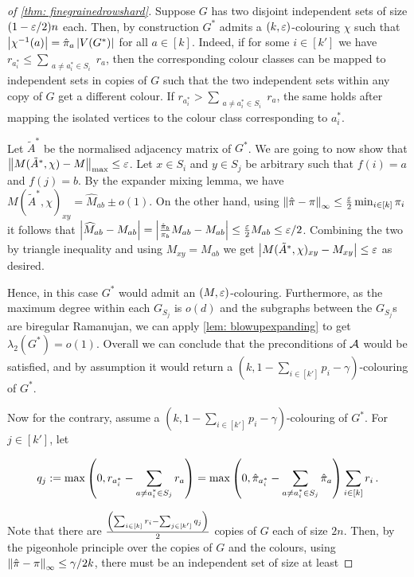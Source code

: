 \begin{proof}[of \cref{thm: finegrainedrowshard}]
    Suppose $G$ has two disjoint independent sets of size $(1-\varepsilon/2)n$ each. Then, by construction $G^*$ admits a $(k, \varepsilon)$-colouring $\chi$ such that $\left\lvert\chi^{-1}(a)\right\rvert=\hat{\pi}_a \left\lvert V(G^*)\right\rvert$ for all $a\in[k]$. Indeed, if for some $i\in[k']$ we have $r_{a_i^*} \leq \sum_{\substack{a \neq a_i^{*} \in S_i}} r_a$, then the corresponding colour classes can be mapped to independent sets in copies of $G$ such that the two independent sets within any copy of $G$ get a different colour. If $r_{a_i^*} > \sum_{\substack{a \neq a_i^{*} \in S_i}} r_a$, the same holds after mapping the isolated vertices to the colour class corresponding to $a_i^*$.
    
    Let $\tilde{A}^*$ be the normalised adjacency matrix of $G^*$. We are going to now show that $\left\lVert M(\tilde{A}^*, \allowbreak\chi)-M\right\rVert_{\max}\leq \varepsilon$. Let $x\in S_i$ and $y\in S_j$ be arbitrary such that $f(i)=a$ and $f(j)=b$. By the expander mixing lemma,  we have $M(\tilde{A}^*, \chi)_{xy}=\widehat{M}_{ab}\pm o(1)$. On the other hand, using $\left\lVert\hat{\pi} - \pi\right\rVert_{\infty}\leq \frac{\varepsilon}{2} \min_{i\in [k]}\pi_i$ it follows that $\left\lvert\widehat{M}_{ab}-M_{ab}\right\rvert=\left\lvert\frac{\hat{\pi}_b}{\pi_b}M_{ab} - M_{ab}\right\rvert\leq \frac{\varepsilon}{2} M_{ab}\leq \varepsilon/2$. Combining the two by triangle inequality and using $M_{xy}=M_{ab}$ we get $\left\lvert M(\tilde{A}^*, \chi)_{xy}-M_{xy}\right\rvert\leq \varepsilon$ as desired.

    Hence, in this case $G^*$ would admit an $(M, \varepsilon)$-colouring. Furthermore, as the maximum degree within each $G_{S_j}$ is $o(d)$ and the subgraphs between the $G_{S_j}$s are biregular Ramanujan, we can apply \cref{lem: blowupexpanding} to get $\lambda_2(G^*)=o(1)$. Overall we can conclude that the preconditions of $\mathcal{A}$ would be satisfied, and by assumption it would return a $(k, 1 - \sum_{i \in [k']} p_i - \gamma)$-colouring of $G^*$.

    Now for the contrary, assume a $(k, 1 - \sum_{i \in [k']} p_i - \gamma)$-colouring of $G^*$. For $j\in[k']$, let
    
    $$q_j:=\max\left(0, r_{a_i^*} - \sum_{\substack{a \neq a_i^{*} \in S_j}} r_a\right)=\max\left(0, \hat{\pi}_{a_i^*} - \sum_{\substack{a \neq a_i^{*} \in S_j}} \hat{\pi}_a\right) \sum_{i\in[k]} r_i\,.$$
    
    Note that there are $\frac{\left(\sum_{i\in[k]} r_i-\sum_{j\in[k']} q_j\right)}{2}$ copies of $G$ each of size $2n$. Then, by the pigeonhole principle over the copies of $G$ and the colours, using $\left\lVert\hat{\pi} - \pi\right\rVert_{\infty}\leq \gamma/2k$, there must be an independent set of size at least 
    

\end{proof}
